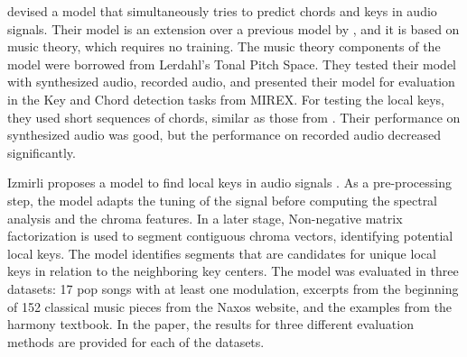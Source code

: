 


\textcite{catteau2007probabilistic} devised a model that
simultaneously tries to predict chords and keys in audio
signals. Their model is an extension over a previous model
by \textcite{bello2005robust}, and it is based on music
theory, which requires no training. The music theory
components of the model were borrowed from Lerdahl's Tonal
Pitch Space. They tested their model with synthesized audio,
recorded audio, and presented their model for evaluation in
the Key and Chord detection tasks from MIREX. For testing
the local keys, they used short sequences of chords, similar
as those from \textcite{krumhansl1982tracing}. Their
performance on synthesized audio was good, but the
performance on recorded audio decreased significantly.



Izmirli proposes a model to find local keys in audio signals
\textcite{izmirli2007localized}. As a pre-processing step,
the model adapts the tuning of the signal before computing
the spectral analysis and the chroma features. In a later
stage, Non-negative matrix factorization is used to segment
contiguous chroma vectors, identifying potential local keys.
The model identifies segments that are candidates for unique
local keys in relation to the neighboring key centers. The
model was evaluated in three datasets: 17 pop songs with at
least one modulation, excerpts from the beginning of 152
classical music pieces from the Naxos website, and the
examples from the \textcite{kostka1984tonal} harmony
textbook. In the paper, the results for three different
evaluation methods are provided for each of the datasets.

